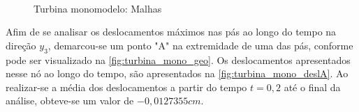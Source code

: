 \begin{figure}[!htbp]
	\caption{Turbina monomodelo: Malhas}
	\centering 
	 \ \
	\label{fig:turbina_mono_malha}
\end{figure}

Afim de se analisar os deslocamentos máximos nas pás ao longo do tempo na direção $y_3$, demarcou-se um ponto "A" na extremidade de uma das pás, conforme pode ser visualizado na \autoref{fig:turbina_mono_geo}. Os deslocamentos apresentados nesse nó ao longo do tempo, são apresentados na \autoref{fig:turbina_mono_deslA}. Ao realizar-se a média dos deslocamentos a partir do tempo $t=0,2$ até o final da análise, obteve-se um valor de $-0,0127355cm$. 



